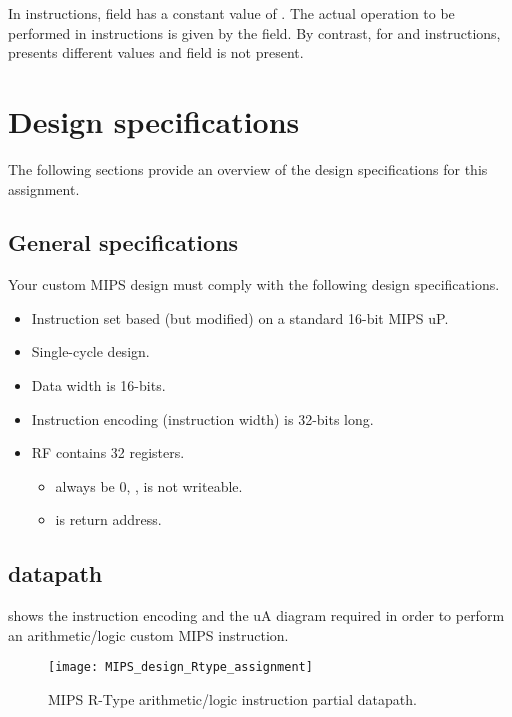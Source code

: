 \documentclass[number=03]{assignment}
\begin{document}
In \Rtype instructions,  field has a constant value of . 
The actual operation to be performed in \Rtype instructions is given by the  field.
By contrast, for \Itype and \Jtype instructions,  presents different values and field  is not present.

\section{Design specifications}
The following sections provide an overview of the design specifications for this assignment.

\subsection{General specifications}\label{sec:general_specs}
Your custom \ac{MIPS} design must comply with the following design specifications.
%
\begin{itemize}
\item Instruction set based (but modified) on a standard 16-bit \ac{MIPS} \ac{uP}.
\item Single-cycle design.
\item Data width is 16-bits.
\item Instruction encoding (instruction width) is 32-bits long.
\item \ac{RF} contains 32 registers.
\begin{itemize}
\item {}  always be 0, \ie,  is not writeable.
\item {} is return address.
\end{itemize}
\end{itemize}
%

\newpage
\subsection{\Rtype datapath}
 shows the instruction encoding and the \ac{uA} diagram required in order to perform an arithmetic/logic custom \ac{MIPS} \Rtype instruction.
%
\begin{figure}[!htb]
\centering
\texttt{[image: MIPS\_design\_Rtype\_assignment]}
\caption{\ac{MIPS} R-Type arithmetic/logic instruction partial datapath.}
\label{figure:RType_schematics}
\end{figure}
%
\end{document}
